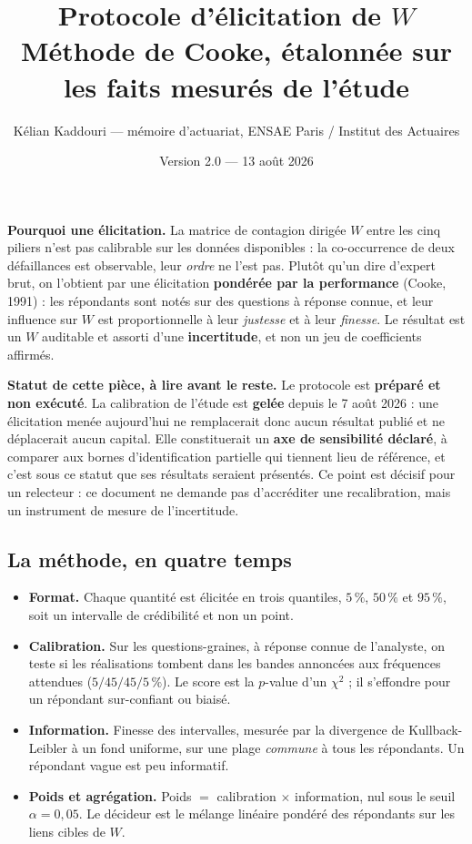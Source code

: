 \documentclass[11pt,a4paper]{article}
\title{\vspace{-1.3cm}\color{navy}\bfseries Protocole d'élicitation de $W$\\[2pt]
  \large Méthode de Cooke, étalonnée sur les faits mesurés de l'étude}
\author{Kélian Kaddouri --- mémoire d'actuariat, ENSAE Paris / Institut des Actuaires}
\date{Version 2.0 --- 13 août 2026}
\begin{document}
\maketitle
\thispagestyle{fancy}
\vspace{-0.6cm}

\begin{cle}
\textbf{Pourquoi une élicitation.} La matrice de contagion dirigée $W$ entre les cinq piliers
n'est pas calibrable sur les données disponibles : la co-occurrence de deux défaillances est
observable, leur \emph{ordre} ne l'est pas. Plutôt qu'un dire d'expert brut, on l'obtient par une
élicitation \textbf{pondérée par la performance} (Cooke, 1991) : les répondants sont notés sur des
questions à réponse connue, et leur influence sur $W$ est proportionnelle à leur \emph{justesse}
et à leur \emph{finesse}. Le résultat est un $W$ auditable et assorti d'une \textbf{incertitude},
et non un jeu de coefficients affirmés.
\end{cle}

\begin{garde}
\textbf{Statut de cette pièce, à lire avant le reste.} Le protocole est \textbf{préparé et non
exécuté}. La calibration de l'étude est \textbf{gelée} depuis le 7 août 2026 : une élicitation
menée aujourd'hui ne remplacerait donc aucun résultat publié et ne déplacerait aucun capital. Elle
constituerait un \textbf{axe de sensibilité déclaré}, à comparer aux bornes d'identification
partielle qui tiennent lieu de référence, et c'est sous ce statut que ses résultats seraient
présentés. Ce point est décisif pour un relecteur : ce document ne demande pas d'accréditer une
recalibration, mais un instrument de mesure de l'incertitude.
\end{garde}

\subsection*{La méthode, en quatre temps}
\begin{itemize}\itemsep2pt
\item \textbf{Format.} Chaque quantité est élicitée en trois quantiles, $5\,\%$, $50\,\%$ et
      $95\,\%$, soit un intervalle de crédibilité et non un point.
\item \textbf{Calibration.} Sur les questions-graines, à réponse connue de l'analyste, on teste
      si les réalisations tombent dans les bandes annoncées aux fréquences attendues
      ($5/45/45/5\,\%$). Le score est la $p$-value d'un $\chi^2$ ; il s'effondre pour un
      répondant sur-confiant ou biaisé.
\item \textbf{Information.} Finesse des intervalles, mesurée par la divergence de
      Kullback-Leibler à un fond uniforme, sur une plage \emph{commune} à tous les répondants.
      Un répondant vague est peu informatif.
\item \textbf{Poids et agrégation.} Poids $=$ calibration $\times$ information, nul sous le seuil
      $\alpha=0{,}05$. Le décideur est le mélange linéaire pondéré des répondants sur les liens
      cibles de $W$.
\end{itemize}
\end{document}
